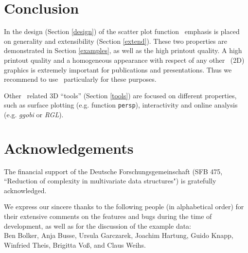 \section{Conclusion\label{conclusion}}
In the design (Section \ref{design}) of the scatter plot function \sdd\ emphasis is placed on generality and extensibility
(Section \ref{extend}).
These two properties are demonstrated in Section \ref{examples}, as well as the high printout quality.
A high printout quality and a homogeneous appearance with respect of any other \RR\ (2D) graphics is extremely important
for publications and presentations. Thus we recommend to use \sdd\ particularly for these purposes.

Other \RR\ related 3D ``tools'' (Section \ref{tools}) are focused on different properties,
such as surface plotting (e.g. function {\tt persp}), interactivity and online analysis (e.g. \emph{ggobi} or \emph{RGL}).


\section*{Acknowledgements}
The financial support of the Deutsche Forschungsgemeinschaft
(SFB 475, ``Reduction of complexity in multivariate data structures") is gratefully acknowledged.

We express our sincere thanks to the following people (in alphabetical order)
for their extensive comments on the features and bugs during the time of development,
as well as for the discussion of the example data:\\
Ben Bolker, Anja Busse, Ursula Garczarek, Joachim Hartung, Guido Knapp, Winfried Theis, Brigitta Vo\ss, and Claus Weihs.

